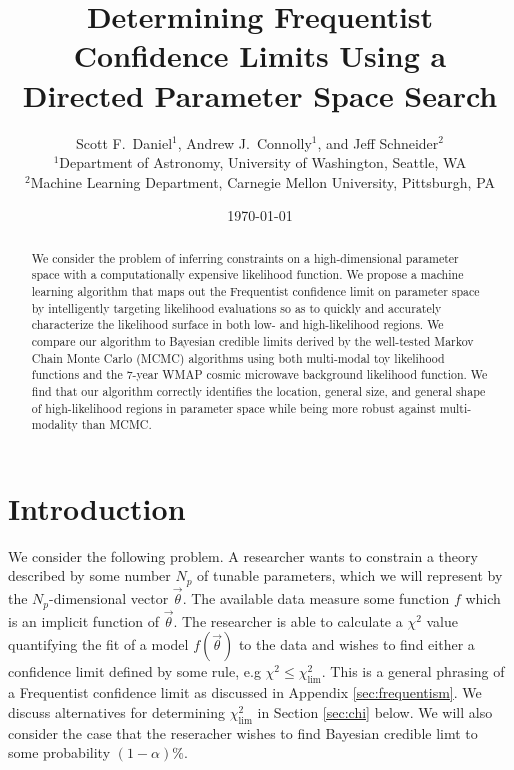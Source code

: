 \documentclass[useAMS,usenatbib]{aastex}
\title
{Determining Frequentist Confidence Limits Using a Directed Parameter Space
Search}
\author
{Scott F.\ Daniel$^1$, Andrew J.\ Connolly$^1$, and Jeff Schneider$^2$\\
$^1$Department of Astronomy, University of Washington, Seattle, WA\\ 
$^2$Machine Learning Department, Carnegie Mellon University, Pittsburgh, PA
}
\begin{document}
 



\label{firstpage}

\date{\today}

\begin{abstract} 
We consider the problem of inferring constraints on a 
high-dimensional parameter
space with a computationally expensive likelihood function.
We propose a machine learning algorithm that maps out the 
Frequentist confidence limit on parameter space by intelligently targeting
likelihood evaluations so as to quickly and accurately characterize the likelihood
surface in both low- and high-likelihood regions.
We compare our algorithm to Bayesian credible limits derived by 
the well-tested Markov Chain Monte Carlo (MCMC)
algorithms using both multi-modal toy likelihood functions and the 
7-year WMAP cosmic microwave background likelihood function.  We find that our
algorithm correctly identifies the location, general size, and general shape of
high-likelihood regions in parameter space while being more robust against
multi-modality than MCMC.
\end{abstract} 

\maketitle

\section{Introduction}
\label{sec:intro}

We consider the following problem.  A researcher wants to constrain a theory
described by some number $N_p$ of tunable parameters, which we will represent by
the $N_p$-dimensional vector $\vec{\theta}$.  The available data measure some
function $f$ which is an implicit function of $\vec{\theta}$.  The researcher
is able to calculate a $\chi^2$ value quantifying the fit of a 
model $f(\vec{\theta})$ to the data and wishes to find either a confidence limit
defined by some rule, e.g $\chi^2\le\chi^2_\text{lim}$.  This is a general
phrasing of a Frequentist confidence limit as discussed in Appendix
\ref{sec:frequentism}.  We discuss alternatives for determining
$\chi^2_\text{lim}$ in Section \ref{sec:chi} below.  We will also consider
the case that the reseracher wishes to find Bayesian credible limt
to some probability $(1-\alpha)\%$.
\end{document}
